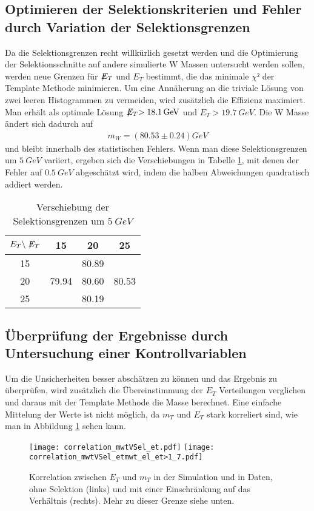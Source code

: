 \documentclass[a4paper,12pt]{article}
\newcommand{\met}{\ensuremath{\not\mathrel{E}}_T}
\begin{document}
\subsection{Optimieren der Selektionskriterien und Fehler durch Variation der Selektionsgrenzen}
Da die Selektionsgrenzen recht willkürlich gesetzt werden und die Optimierung der Selektionsschnitte
auf andere simulierte W Massen untersucht werden sollen, werden neue Grenzen für $\met$ und $E_{T}$
bestimmt, die das minimale $χ²$ der Template Methode minimieren.
Um eine Annäherung an die triviale Lösung von zwei leeren Histogrammen zu vermeiden, wird zusätzlich
die Effizienz maximiert. Man erhält als optimale Lösung $\met> \SI{18.1}{GeV}$ und $E_{T} >
\SI{19.7}{GeV}$. Die W Masse ändert sich dadurch auf
\begin{align*}
	m_W = ( 80.53 ± 0.24 ) \si{GeV}
\end{align*}
und bleibt innerhalb des statistischen Fehlers. Wenn man diese Selektionsgrenzen um $\SI{5}{GeV}$
variiert, ergeben sich die Verschiebungen in Tabelle \ref{tab:variation}, mit denen der Fehler
auf $\SI{0.5}{GeV}$ abgeschätzt wird, indem die halben Abweichungen quadratisch addiert werden.
\begin{table}
	\centering
	\begin{tabular}{c| c c c}
		$E_{T} \backslash \met$ & 15 & 20 & 25 \\
		\hline
		15 &  & 80.89 & \\
		20 & 79.94 & 80.60 & 80.53 \\
		25 &  & 80.19 &
	\end{tabular}
	\caption{Verschiebung der Selektionsgrenzen um $\SI{5}{GeV}$}
	\label{tab:variation}
\end{table}



\subsection{Überprüfung der Ergebnisse durch Untersuchung einer Kontrollvariablen}
Um die Unsicherheiten besser abschätzen zu können und das Ergebnis zu überprüfen, wird zusätzlich
die Übereinstimmung der $E_T$ Verteilungen verglichen und daraus mit der Template Methode die Masse
berechnet. Eine einfache Mittelung der Werte ist nicht möglich, da $m_T$ und $E_T$ stark korreliert
sind, wie man in Abbildung \ref{fig:correlation} sehen kann.
\begin{figure}[htb]
	\centering
	\texttt{[image: correlation\_mwtVSel\_et.pdf]}
	\texttt{[image: correlation\_mwtVSel\_etmwt\_el\_et>1\_7.pdf]}
	\caption{Korrelation zwischen $E_T$ und $m_T$ in der Simulation und in Daten, ohne Selektion
	(links) und mit einer Einschränkung auf das Verhältnis (rechts). Mehr zu dieser Grenze siehe
	unten.}
	\label{fig:correlation}
\end{figure}
\end{document}
